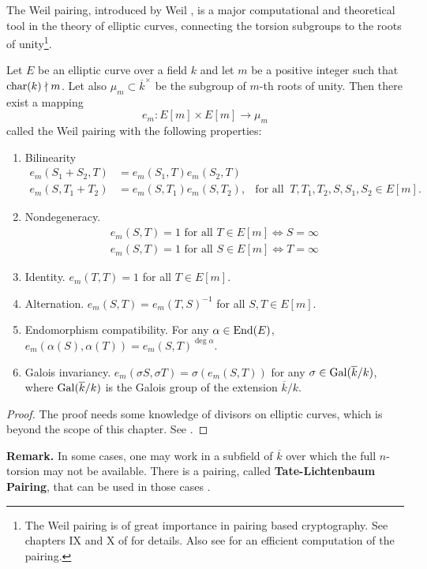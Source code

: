 The Weil pairing, introduced by Weil \cite{Weilp1940}, is a major computational and theoretical tool 
in the theory of elliptic curves, connecting the torsion subgroups to the roots of 
unity\footnote{The Weil pairing is of great importance in pairing based cryptography. See  chapters 
IX and X of \cite{Blake2004} for details. Also see \cite{Miller2004} for an efficient computation of 
the pairing.}. 
\begin{theorem}
\label{theorem:Weil-pairing}
Let $E$ be an elliptic curve over a field $k$ and let $m$ be a positive integer such that 
$\operatorname{char}(k) \nmid m$. Let also $\mu_m \subset \overline{k}^\times$ be the subgroup of $m$-th 
roots of unity. Then there exist a mapping 
$$
e_m: E[m] \times E[m] \longrightarrow \mu_m
$$
called the Weil pairing with the following properties:
\begin{enumerate}
\item 
Bilinearity
\begin{align*}
e_m(S_1 + S_2, T) &= e_m(S_1, T)e_m(S_2, T) \\
e_m(S, T_1 + T_2) &= e_m(S, T_1)e_m(S, T_2), & \text{for all }\: T, T_1, T_2, S, S_1, S_2 \in E[m]. 
\end{align*}
\item
Nondegeneracy.
\begin{align*}
e_m(S, T) = 1 \text{ for all } T \in E[m] \Leftrightarrow S = \infty \\
e_m(S, T) = 1 \text{ for all } S \in E[m] \Leftrightarrow T = \infty
\end{align*}
\item
Identity. $e_m(T, T) = 1$ for all $T \in E[m]$.
\item
Alternation. $e_m(S, T) = e_m(T, S)^{-1}$ for all $S, T \in E[m]$.
\item
Endomorphism compatibility. For any $\alpha \in \operatorname{End}(E)$, $e_m(\alpha(S), \alpha(T)) = e_m(S, 
T)^{\deg \alpha}$.
\item
\label{item:Weil-pair-aut}
Galois invariancy. $e_m(\sigma S, \sigma T) = \sigma(e_m(S, T))$ for any $\sigma \in 
\operatorname{Gal}(\overline{k} / k)$, where $\operatorname{Gal}(\overline{k} / k)$ is the Galois group of the extension 
$\overline{k} / k$. 
\end{enumerate}
\end{theorem}
\begin{proof}
The proof needs some knowledge of divisors on elliptic curves, which is beyond the scope of this 
chapter. See \cite[Sec. 3.8]{Silverman2009}.
\end{proof}
\textbf{Remark.} In some cases, one may work in a subfield of $\overline{k}$ over which the full 
$n$-torsion may not be available. There is a pairing, called \textbf{Tate-Lichtenbaum Pairing}, that 
can be used in those cases \cite{Frey1994, Lichtenbaum1969}.

